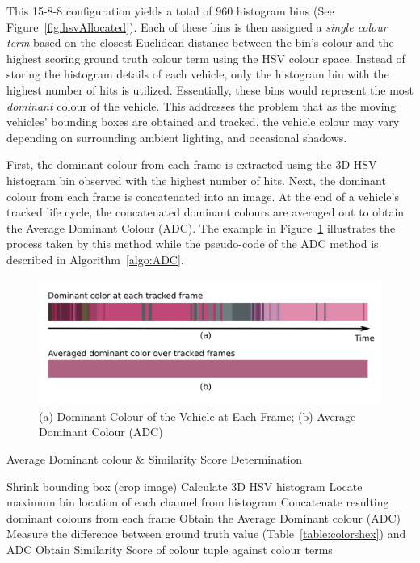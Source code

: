 This 15-8-8 configuration yields a total of 960 histogram bins (See Figure~\ref{fig:hsvAllocated}).
Each of these bins is then assigned a \textit{single colour term} based on the closest Euclidean distance between the bin's colour and the highest scoring ground truth colour term using the HSV colour space.
Instead of storing the histogram details of each vehicle, only the histogram bin with the highest number of hits is utilized.
Essentially, these bins would represent the most \textit{dominant} colour of the vehicle.%
This addresses the problem that as the moving vehicles' bounding boxes are obtained and tracked, the vehicle colour may vary depending on surrounding ambient lighting, and occasional shadows. 

First, the dominant colour from each frame is extracted using the 3D HSV histogram bin observed with the highest number of hits. Next, the dominant colour from each frame is concatenated into an image. At the end of a vehicle's tracked life cycle, the concatenated dominant colours are averaged out to obtain the Average Dominant Colour (ADC). The example in Figure~\ref{fig:ADC} illustrates the process taken by this method while the pseudo-code of the ADC method is described in Algorithm~\ref{algo:ADC}.

\begin{figure}[hbt!]\centering
\includegraphics[width=.9\textwidth]{image/general/ADC.png}
\caption{(a) Dominant Colour of the Vehicle at Each Frame; (b) Average Dominant Colour (ADC)}
\label{fig:ADC}
\end{figure}

\begin{algorithm}[!h]
  \caption{Average Dominant colour \& Similarity Score Determination}
  \label{algo:ADC}
  \begin{algorithmic}[1]
        \STATE Shrink bounding box (crop image)
        \STATE Calculate 3D HSV histogram
        \STATE Locate maximum bin location of each channel from histogram
        \STATE Concatenate resulting dominant colours from each frame
        \STATE Obtain the Average Dominant colour (ADC)
        \STATE Measure the difference between ground truth value (Table~\ref{table:colorshex}) and ADC
        \STATE Obtain Similarity Score of colour tuple against colour terms
    \ENDFOR
  \end{algorithmic}
\end{algorithm}

